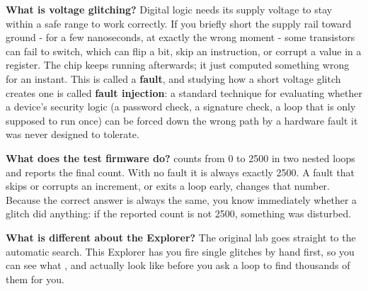 \documentclass[11pt,letterpaper]{article}
\begin{document}
\guidelegend

\vspace{4pt}


\clearpage

\tableofcontents

\clearpage


\textbf{What is voltage glitching?} Digital logic needs its supply voltage to stay within a safe range to work
correctly. If you briefly short the supply rail toward ground - for a few nanoseconds, at exactly the wrong moment -
some transistors can fail to switch, which can flip a bit, skip an instruction, or corrupt a value in a register. The
chip keeps running afterwards; it just computed something wrong for an instant. This is called a \textbf{fault}, and
studying how a short voltage glitch creates one is called \textbf{fault injection}: a standard technique for
evaluating whether a device's security logic (a password check, a signature check, a loop that is only supposed to run
once) can be forced down the wrong path by a hardware fault it was never designed to tolerate.

\textbf{What does the test firmware do?}  counts from 0 to 2500 in two nested loops and reports
the final count. With no fault it is always exactly 2500. A fault that skips or corrupts an increment, or exits a loop
early, changes that number. Because the correct answer is always the same, you know immediately whether a glitch did
anything: if the reported count is not 2500, something was disturbed.

\textbf{What is different about the Explorer?} The original lab goes straight to the automatic search. This Explorer
has you fire single glitches by hand first, so you can see what ,  and 
actually look like before you ask a loop to find thousands of them for you.
\end{document}

